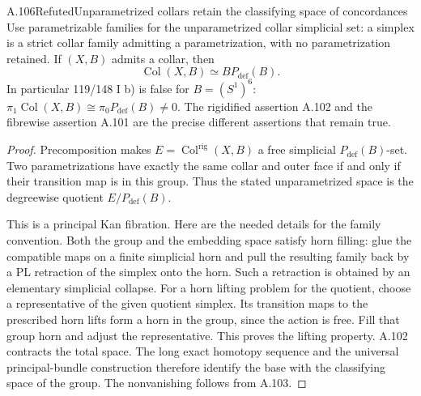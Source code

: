\begin{saresult}{A.106}{Refuted}{Unparametrized collars retain the classifying space of concordances}
Use parametrizable families for the unparametrized collar simplicial set:
a simplex is a strict collar family admitting a parametrization, with no
parametrization retained. If $(X,B)$ admits a collar, then
\[
 \operatorname{Col}(X,B)\simeq BP_{\mathrm{def}}(B).
\]
In particular 119/148 I b) is false for $B=(S^1)^6$:
$\pi_1\operatorname{Col}(X,B)\cong\pi_0P_{\mathrm{def}}(B)\ne0$.
The rigidified assertion A.102 and the fibrewise assertion A.101 are
the precise different assertions that remain true.
\end{saresult}
\begin{proof}
Precomposition makes $E=\operatorname{Col}^{\mathrm{rig}}(X,B)$ a free
simplicial $P_{\mathrm{def}}(B)$-set. Two parametrizations have exactly
the same collar and outer face if and only if their transition map is
in this group. Thus the stated unparametrized space is the degreewise
quotient $E/P_{\mathrm{def}}(B)$.

This is a principal Kan fibration. Here are the needed details for the
family convention. Both the group and the embedding space satisfy horn
filling: glue the compatible maps on a finite simplicial horn and pull
the resulting family back by a PL retraction of the simplex onto the
horn. Such a retraction is obtained by an elementary simplicial collapse.
For a horn lifting problem for the quotient, choose a representative of
the given quotient simplex. Its transition maps to the prescribed horn
lifts form a horn in the group, since the action is free. Fill that
group horn and adjust the representative. This proves the lifting
property. A.102 contracts the total space. The long exact homotopy
sequence and the universal principal-bundle construction therefore
identify the base with the classifying space of the group. The
nonvanishing follows from A.103.
\end{proof}

